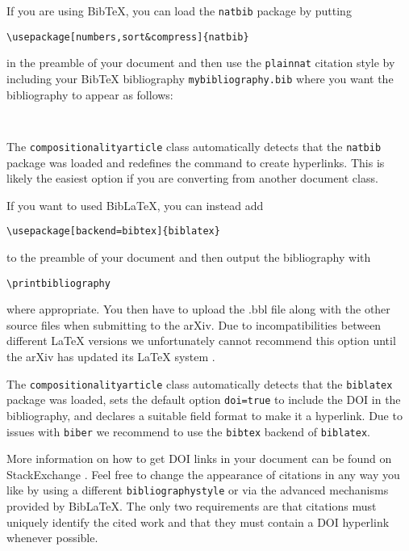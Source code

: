 \documentclass[
    accepted=2020-05-01,
    published=true,
    issue=1, 
    volume=2, 
    a4paper,
]{compositionalityarticle}
\begin{document}
If you are using BibTeX, you can load the \texttt{natbib} package by putting
\begin{verbatim}
\usepackage[numbers,sort&compress]{natbib}
\end{verbatim}
in the preamble of your document and then use the \texttt{plainnat} citation style by including your BibTeX bibliography \texttt{mybibliography.bib} where you want the bibliography to appear as follows:
\begin{verbatim}


\end{verbatim}
The \texttt{compositionalityarticle} class automatically detects that the \texttt{natbib} package was loaded and redefines the \texttt{\string\doi} command to create hyperlinks.
This is likely the easiest option if you are converting from another document class.

If you want to used BibLaTeX, you can instead add
\begin{verbatim}
\usepackage[backend=bibtex]{biblatex}

\end{verbatim}
to the preamble of your document and then output the bibliography with
\begin{verbatim}
\printbibliography
\end{verbatim}
where appropriate.
You then have to upload the .bbl file along with the other source files when submitting to the arXiv.
Due to incompatibilities between different LaTeX versions we unfortunately cannot recommend this option until the arXiv has updated its LaTeX system \cite{biblatexsubmittingtothearxiv}.

The \texttt{compositionalityarticle} class automatically detects that the \texttt{biblatex} package was loaded, sets the default option \texttt{doi=true} to include the DOI in the bibliography, and declares a suitable field format to make it a hyperlink.
Due to issues with \texttt{biber} we recommend to use the \texttt{bibtex} backend of \texttt{biblatex}.

More information on how to get DOI links in your document can be found on StackExchange \cite{howtogetdoilinksinbibliography,automaticallyaddingdoifieldstoahandmadebibliography}.
Feel free to change the appearance of citations in any way you like by using a different \texttt{bibliographystyle} or via the advanced mechanisms provided by BibLaTeX.
The only two requirements are that citations must uniquely identify the cited work and that they must contain a DOI hyperlink whenever possible.
\end{document}
